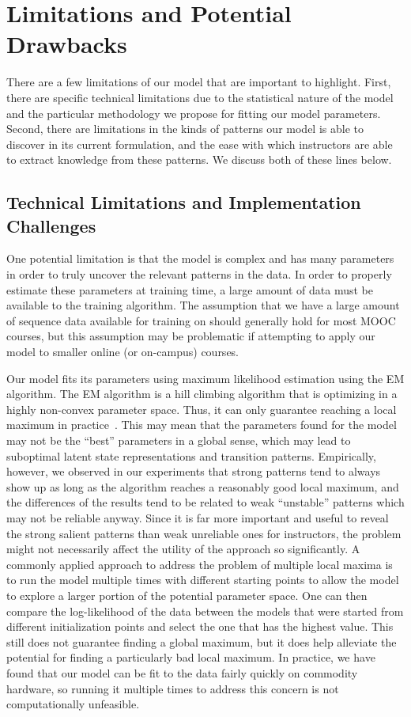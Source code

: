 \section{Limitations and Potential Drawbacks}

There are a few limitations of our model that are important to highlight.
First, there are specific technical limitations due to the statistical
nature of the model and the particular methodology we propose for fitting
our model parameters. Second, there are limitations in the kinds of
patterns our model is able to discover in its current formulation, and the
ease with which instructors are able to extract knowledge from these
patterns. We discuss both of these lines below.

\subsection{Technical Limitations and Implementation Challenges}

One potential limitation is that the model is complex and has many parameters
in order to truly uncover the relevant patterns in the data. In order to
properly estimate these parameters at training time, a large amount of data
must be available to the training algorithm. The assumption that we have a
large amount of sequence data available for training on should generally
hold for most MOOC courses, but this assumption may be problematic if
attempting to apply our model to smaller online (or on-campus) courses.

Our model fits its parameters using maximum likelihood estimation using the
EM algorithm. The EM algorithm is a hill climbing algorithm that is
optimizing in a highly non-convex parameter space. Thus, it can only
guarantee reaching a local maximum in practice~\citep{Dempster:1977:JRSS}.
This may mean that the parameters found for the model may not be the
``best'' parameters in a global sense, which may lead to suboptimal latent
state representations and transition patterns. Empirically, however, we
observed in our experiments that strong patterns tend to always show up as
long as the algorithm reaches a reasonably good local maximum, and the
differences of the results tend to be related to weak ``unstable'' patterns
which may not be reliable anyway. Since it is far more important and useful
to reveal the strong salient patterns than weak unreliable ones for
instructors, the problem might not necessarily affect the utility of the
approach so significantly.  A commonly applied approach to address the
problem of multiple local maxima is to run the model multiple times with
different starting points to allow the model to explore a larger portion of
the potential parameter space. One can then compare the log-likelihood of
the data between the models that were started from different initialization
points and select the one that has the highest value. This still does not
guarantee finding a global maximum, but it does help alleviate the
potential for finding a particularly bad local maximum.  In practice, we
have found that our model can be fit to the data fairly quickly on
commodity hardware, so running it multiple times to address this concern is
not computationally unfeasible.


